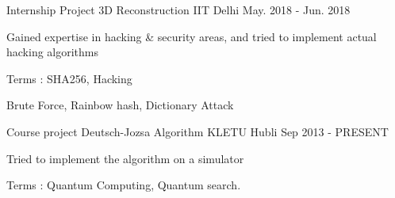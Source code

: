 \begin{cventries}

\cventry
{Internship Project} %
{3D Reconstruction} %
{IIT Delhi} %
{May. 2018 - Jun. 2018} %
{ %
\begin{cvitems}
\item {Gained expertise in hacking \& security areas, and tried to implement actual hacking algorithms}
\item {Terms : SHA256, Hacking}
\item {Brute Force, Rainbow hash, Dictionary Attack}
\end{cvitems}
}


\cventry
{Course project} %
{Deutsch-Jozsa Algorithm} %
{KLETU Hubli} %
{Sep 2013 - PRESENT} %
{ %
\begin{cvitems}
\item {Tried to implement the algorithm on a simulator}
\item {Terms : Quantum Computing, Quantum search.}
\end{cvitems}
}


\end{cventries}